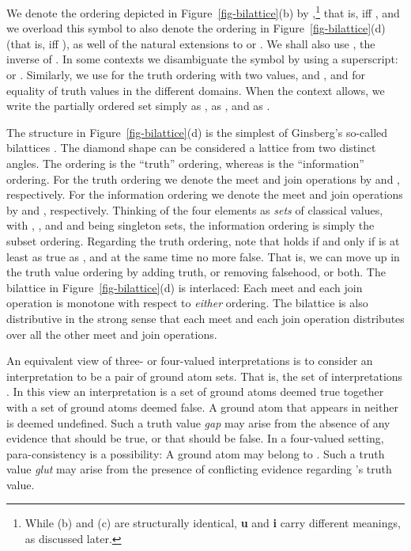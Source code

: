 \documentclass{tlp}
\begin{document}
We denote the ordering depicted in Figure~\ref{fig-bilattice}(b) by
,\footnote{While (b) and (c) are structurally identical, 
\textbf{u} and \textbf{i} carry different meanings, as discussed later.} 
that is,  iff
, and we overload this symbol
to also denote the ordering in Figure~\ref{fig-bilattice}(d)
(that is,  iff
), as well
of the natural extensions to  or
.
We shall also use , the inverse of .
In some contexts we disambiguate the symbol by using a superscript:
 or .  Similarly, we use
 for the truth ordering with two values, and ,  and 
for equality of truth values in the different domains.
When the context allows, we write the partially ordered set 
 simply as ,  as ,
and  as .

The structure in Figure~\ref{fig-bilattice}(d) is the simplest of
Ginsberg's so-called bilattices \cite{ginsberg:1988}.
The diamond shape can be considered a lattice from two distinct angles.
The ordering  is the ``truth'' ordering, whereas 
is the ``information'' ordering.
For the truth ordering we denote the meet and join operations by
 and , respectively.
For the information ordering we denote the meet and join operations by
 and , respectively.
Thinking of the four elements as \emph{sets} of classical values,
with , ,
and  and  being singleton sets,
the information ordering is simply the subset ordering.
Regarding the truth ordering, note that
 holds if and only if  is at least as true
as , and at the same time no more false.
That is, we can move up in the truth value ordering by adding
truth, or removing falsehood, or both.
The bilattice in Figure~\ref{fig-bilattice}(d) is interlaced: 
Each meet and each join operation is monotone with respect to 
\emph{either} ordering.
The bilattice is also distributive in the strong sense that each meet and
each join operation distributes over all the other meet and join 
operations.

An equivalent view of three- or four-valued interpretations is to
consider an interpretation to be a pair of ground atom sets.
That is, the set of interpretations
.
In this view an interpretation  is a set  of
ground atoms deemed true together with a set  of ground atoms 
deemed false.
A ground atom  that appears in neither is deemed undefined.
Such a truth value \emph{gap} may arise from the absence of any
evidence that  should be true, or that  should be false.
In a four-valued setting, para-consistency is a possibility:
A ground atom  may belong to .
Such a truth value \emph{glut} may arise from the presence of
conflicting evidence regarding 's truth value.
\end{document}
